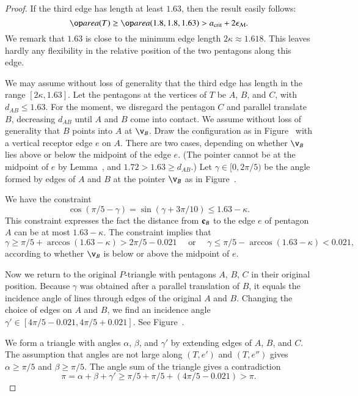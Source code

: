 \begin{proof}  
  If the third edge has length at least $1.63$, then the result easily
  follows:
\[
\area(T) \ge \area(1.8,1.8,1.63) > \acrit + 2\epsM.
\]
We remark that $1.63$ is close to the minimum edge length
$2\kappa\approx 1.618$.  This leaves hardly any flexibility in the
relative position of the two pentagons along this edge.

We may assume without loss of generality that the third edge has
length in the range $[2\kappa,1.63]$.  Let the pentagons at the
vertices of $T$ be $A$, $B$, and $C$, with $d_{AB}\le 1.63$.  For the
moment, we disregard the pentagon $C$ and parallel translate $B$,
decreasing $d_{AB}$ until $A$ and $B$ come into contact.  We assume
without loss of generality that $B$ points into $A$ at $\v_B$.  Draw
the configuration as in Figure~ with a vertical
receptor edge $e$ on $A$.  There are two cases, depending on whether
$\v_B$ lies above or below the midpoint of the edge $e$.  (The pointer
cannot be at the midpoint of $e$ by Lemma~, and
$1.72 > 1.63 \ge d_{AB}$.)  Let $\gamma\in[0,2\pi/5)$ be the angle
formed by edges of $A$ and $B$ at the pointer $\v_B$ as in
Figure~.

We have the constraint
\[
\cos(\pi/5 - \gamma) =\sin(\gamma+3\pi/10) \le 1.63 - \kappa.
\]
This constraint expresses the fact the distance from ${\mathbf c}_B$ to the
edge $e$ of pentagon $A$ can be at most $1.63-\kappa$.  The constraint
implies that
\[
\gamma \ge \pi/5 +
\arccos (1.63-\kappa) > 2\pi/5 - 0.021\quad \text{ or }\quad
%
\gamma\le \pi/5 - \arccos(1.63-\kappa) < 0.021,
\]
according to whether $\v_B$ is below or above the midpoint of $e$.

Now we return to the original $P$-triangle with pentagons $A$, $B$,
$C$ in their original position.  Because $\gamma$ was obtained after a
parallel translation of $B$, it equals the incidence angle of lines
through edges of the original $A$ and $B$.  Changing the choice of
edges on $A$ and $B$, we find an incidence angle  $\gamma' \in
[4\pi/5-0.021,4\pi/5+0.021]$.  See Figure~.

We form a triangle with angles $\alpha$, $\beta$, and $\gamma'$ by
extending edges of $A$, $B$, and $C$.  The assumption that angles are
not large along $(T,e')$ and $(T,e'')$ gives $\alpha\ge \pi/5$ and
$\beta\ge \pi/5$.  The angle sum of the triangle gives a contradiction
\[
\pi=\alpha+\beta+\gamma' 
\ge  \pi/5 + \pi/5 + (4\pi/5 - 0.021) > \pi.
\]
\end{proof}


